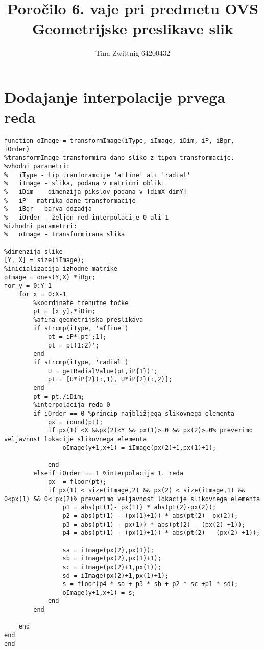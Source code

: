 \documentclass[12pt,a4paper]{article}
\author{Tina Zwittnig 64200432}
\title{Poročilo 6. vaje pri predmetu OVS \\ Geometrijske preslikave slik}
\begin{document}
\maketitle
\pagebreak
\section{Dodajanje interpolacije prvega reda}
\begin{verbatim}
function oImage = transformImage(iType, iImage, iDim, iP, iBgr, iOrder)
%transformImage transformira dano sliko z tipom transformacije. 
%vhodni parametri:
%   iType - tip tranforamcije 'affine' ali 'radial'
%   iImage - slika, podana v matrični obliki
%   iDim -  dimenzija pikslov podana v [dimX dimY]
%   iP - matrika dane transformacije
%   iBgr - barva odzadja
%   iOrder - željen red interpolacije 0 ali 1
%izhodni parametrri:
%   oImage - transformirana slika

%dimenzija slike
[Y, X] = size(iImage);
%inicializacija izhodne matrike
oImage = ones(Y,X) *iBgr;
for y = 0:Y-1
    for x = 0:X-1
        %koordinate trenutne točke
        pt = [x y].*iDim;
        %afina geometrijska preslikava
        if strcmp(iType, 'affine')
            pt = iP*[pt';1];
            pt = pt(1:2)';
        end
        if strcmp(iType, 'radial')
            U = getRadialValue(pt,iP{1})';
            pt = [U*iP{2}(:,1), U*iP{2}(:,2)];
        end
        pt = pt./iDim;
        %interpolacija reda 0
        if iOrder == 0 %princip najbližjega slikovnega elementa
            px = round(pt); 
            if px(1) <X &&px(2)<Y && px(1)>=0 && px(2)>=0% preverimo veljavnost lokacije slikovnega elementa
                oImage(y+1,x+1) = iImage(px(2)+1,px(1)+1);
        
            end
        elseif iOrder == 1 %interpolacija 1. reda
            px  = floor(pt);
            if px(1) < size(iImage,2) && px(2) < size(iImage,1) && 0<px(1) && 0< px(2)% preverimo veljavnost lokacije slikovnega elementa
                p1 = abs(pt(1)- px(1)) * abs(pt(2)-px(2));
                p2 = abs(pt(1) - (px(1)+1)) * abs(pt(2) -px(2));
                p3 = abs(pt(1) - px(1)) * abs(pt(2) - (px(2) +1));
                p4 = abs(pt(1) - (px(1)+1)) * abs(pt(2) - (px(2) +1));
              
                sa = iImage(px(2),px(1));
                sb = iImage(px(2),px(1)+1);
                sc = iImage(px(2)+1,px(1));
                sd = iImage(px(2)+1,px(1)+1);
                s = floor(p4 * sa + p3 * sb + p2 * sc +p1 * sd);
                oImage(y+1,x+1) = s;
            end
        end
        
    end
end
end
\end{verbatim}
\end{document}
